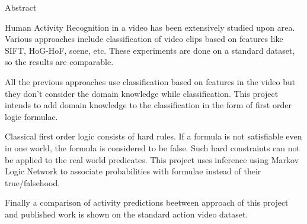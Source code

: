\begin{center}
\LARGE{Abstract}
\end{center}

\vspace{0.5in}

Human Activity Recognition in a video has been extensively studied upon area. 
Various approaches include classification of video clips based on features like SIFT, HoG-HoF, scene, etc.
These experiments are done on a standard dataset, so the results are comparable.

All the previous approaches use classification based on features in the video but they don't consider the domain knowledge while classification.
This project intends to add domain knowledge to the classification in the form of first order logic formulae.

Classical first order logic consists of hard rules. 
If a formula is not satisfiable even in one world, 
the formula is considered to be false. 
Such hard constraints can not be applied to the real world predicates. 
This project uses inference using Markov Logic Network 
to associate probabilities with formulae instead of their true/falsehood.

Finally a comparison of activity predictions beetween 
approach of this project and 
published work is shown on the standard action video dataset.
